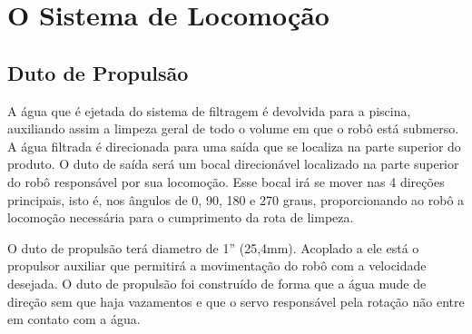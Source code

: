 \section{O Sistema de Locomoção}
\subsection{Duto de Propulsão}
A água que é ejetada do sistema de filtragem é devolvida para a piscina, auxiliando assim a limpeza geral de todo o volume em que o robô está submerso. A água filtrada é direcionada para uma saída que se localiza na parte superior do produto. O duto de saída será um bocal direcionável localizado na parte superior do robô responsável por sua locomoção. Esse bocal irá se mover nas 4 direções principais, isto é, nos ângulos de 0, 90, 180 e 270 graus, proporcionando ao robô a locomoção necessária para o cumprimento da rota de limpeza.

O duto de propulsão terá diametro de 1” (25,4mm). Acoplado a ele está o propulsor auxiliar que permitirá a movimentação do robô com a velocidade desejada. O duto de propulsão foi construído de forma que a água mude de direção sem que haja vazamentos e que o servo responsável pela rotação não entre em contato com a água.

